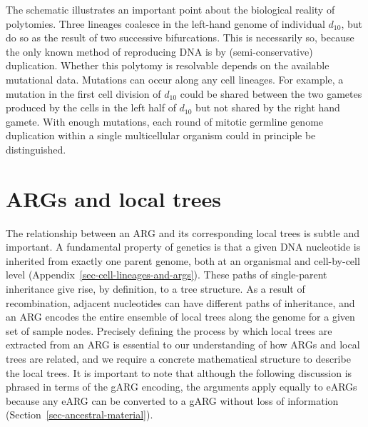 \documentclass[9pt,twocolumn,twoside]{gsajnl}
\begin{document}
The schematic illustrates an important point about the biological reality of polytomies.
Three lineages coalesce in the left-hand genome of individual $d_{10}$, but do
so as the result of two successive bifurcations. This is necessarily so,
because the only known method of reproducing DNA is by (semi-conservative) duplication.
Whether this polytomy is resolvable depends on the available mutational data.
Mutations can occur along any cell lineages. For example,
a mutation in the first cell division of $d_{10}$ could be shared between
the two gametes produced by the cells in the left half of $d_{10}$
but not shared by the right hand gamete.
With enough mutations, each
round of mitotic germline genome duplication within a single multicellular organism could
in principle be distinguished.

\section{ARGs and local trees}
\label{sec-ARG-and-local-trees}
The relationship between an ARG and its corresponding
local trees is subtle and important.
A fundamental property of genetics is that a
given DNA nucleotide is inherited from exactly one parent genome,
both at an organismal and cell-by-cell level
(Appendix~\ref{sec-cell-lineages-and-args}).
These paths of single-parent inheritance give rise,
by definition, to a tree structure.
As a result of recombination, adjacent nucleotides can have
different paths of inheritance, and
an ARG encodes the entire ensemble of local trees along the
genome for a given set of sample nodes.
Precisely defining the process by which local trees are extracted
from an ARG is essential to our understanding of how ARGs and local trees
are related, and we require a concrete mathematical structure
to describe the local trees. It is important to note that
although the following discussion is phrased in terms of the
gARG encoding,  the arguments apply equally to eARGs
because any eARG can be converted to a
gARG without loss of information (Section~\ref{sec-ancestral-material}).
\end{document}
